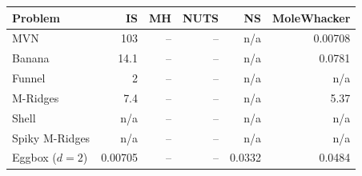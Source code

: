 \begin{tabular}{lrrrrr}
\toprule
Problem & IS & MH & NUTS & NS & MoleWhacker \\
\midrule
MVN & 103 & -- & -- & n/a & 0.00708 \\
Banana & 14.1 & -- & -- & n/a & 0.0781 \\
Funnel & 2 & -- & -- & n/a & n/a \\
M-Ridges & 7.4 & -- & -- & n/a & 5.37 \\
Shell & n/a & -- & -- & n/a & n/a \\
Spiky M-Ridges & n/a & -- & -- & n/a & n/a \\
\midrule
Eggbox ($d=2$) & 0.00705 & -- & -- & 0.0332 & 0.0484 \\
\bottomrule
\end{tabular}
